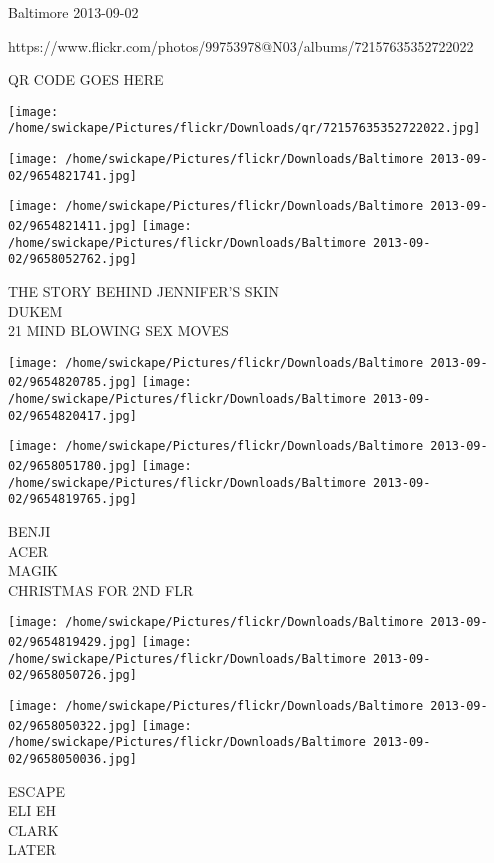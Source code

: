 \documentclass[10pt,letterpaper]{article}
\begin{document}
Baltimore 2013-09-02

https://www.flickr.com/photos/99753978@N03/albums/72157635352722022

QR CODE GOES HERE

\texttt{[image: /home/swickape/Pictures/flickr/Downloads/qr/72157635352722022.jpg]}
\pagebreak

\texttt{[image: /home/swickape/Pictures/flickr/Downloads/Baltimore 2013-09-02/9654821741.jpg]}

\vspace{0.25in}
\texttt{[image: /home/swickape/Pictures/flickr/Downloads/Baltimore 2013-09-02/9654821411.jpg]}
\texttt{[image: /home/swickape/Pictures/flickr/Downloads/Baltimore 2013-09-02/9658052762.jpg]}

THE STORY BEHIND JENNIFER'S SKIN\\
DUKEM\\
21 MIND BLOWING SEX MOVES\\
\pagebreak

\texttt{[image: /home/swickape/Pictures/flickr/Downloads/Baltimore 2013-09-02/9654820785.jpg]}
\texttt{[image: /home/swickape/Pictures/flickr/Downloads/Baltimore 2013-09-02/9654820417.jpg]}

\texttt{[image: /home/swickape/Pictures/flickr/Downloads/Baltimore 2013-09-02/9658051780.jpg]}
\texttt{[image: /home/swickape/Pictures/flickr/Downloads/Baltimore 2013-09-02/9654819765.jpg]}

BENJI\\
ACER\\
MAGIK\\
CHRISTMAS FOR 2ND FLR\\
\pagebreak

\texttt{[image: /home/swickape/Pictures/flickr/Downloads/Baltimore 2013-09-02/9654819429.jpg]}
\texttt{[image: /home/swickape/Pictures/flickr/Downloads/Baltimore 2013-09-02/9658050726.jpg]}

\texttt{[image: /home/swickape/Pictures/flickr/Downloads/Baltimore 2013-09-02/9658050322.jpg]}
\texttt{[image: /home/swickape/Pictures/flickr/Downloads/Baltimore 2013-09-02/9658050036.jpg]}

ESCAPE\\
ELI EH\\
CLARK\\
LATER\\
\pagebreak
\end{document}
